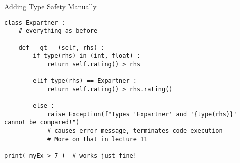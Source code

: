 
\begin{frame}[fragile]{Adding Type Safety Manually}

\vspace{-6pt}
\begin{codebox}
\begin{verbatim}
class Expartner :
    # everything as before
    
    def __gt__ (self, rhs) :
        if type(rhs) in (int, float) :
            return self.rating() > rhs
            
        elif type(rhs) == Expartner :
            return self.rating() > rhs.rating()
            
        else :
            raise Exception(f"Types 'Expartner' and '{type(rhs)}' cannot be compared!")
            # causes error message, terminates code execution
            # More on that in lecture 11

print( myEx > 7 )  # works just fine!
\end{verbatim}
\end{codebox}
%
\end{frame}


